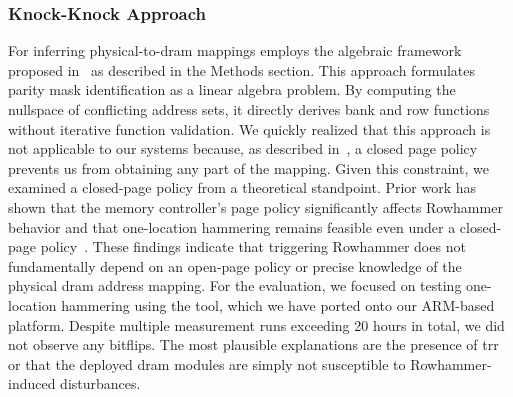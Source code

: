     \subsubsection{Knock-Knock Approach} \label{subsec:knock-knock-approach}
        For inferring physical-to-\gls{dram} mappings employs the algebraic framework proposed in~\cite{paperKnockKnock} 
        as described in the Methods section. This approach formulates parity mask identification 
        as a linear algebra problem. By computing the nullspace of conflicting address sets, it directly 
        derives bank and row functions without iterative function validation. We quickly realized that this 
        approach is not applicable to our systems because, as described in~\cite{paperKnockKnock}, a closed page policy prevents 
        us from obtaining any part of the mapping. Given this constraint, we examined a closed-page policy from 
        a theoretical standpoint. Prior work has shown that the memory controller's page policy significantly 
        affects Rowhammer behavior and that one-location hammering remains feasible even under a closed-page 
        policy~\cite{paperAnotherFlip, paperNethammer}. These findings indicate that triggering Rowhammer does not fundamentally depend on 
        an open-page policy or precise knowledge of the physical \gls{dram} address mapping. For the evaluation,
        we focused on testing one-location hammering using the \cite{toolFlipfloyd} tool, which we have ported onto our ARM-based platform. 
        Despite multiple measurement runs exceeding 20 hours in total, we did not observe any bitflips. The 
        most plausible explanations are the presence of \gls{trr} or that the deployed 
        \gls{dram} modules are simply not susceptible to Rowhammer-induced disturbances.

